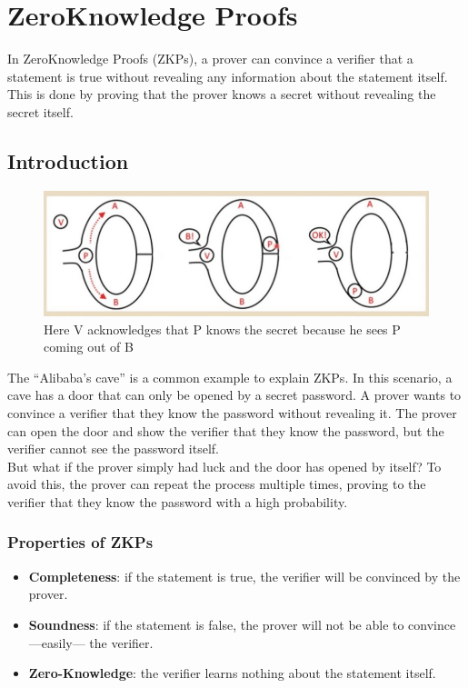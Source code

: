 \chapter{ZeroKnowledge Proofs}

In ZeroKnowledge Proofs (ZKPs), a prover can convince a verifier that a statement is true without revealing any information about the statement itself. This is done by proving that the prover knows a secret without revealing the secret itself.

\section{Introduction}

\begin{figure}[htbp]
   \centering
   \includegraphics{images/alibaba.png}
   \caption{Here V acknowledges that P knows the secret because he sees P coming out of B}
   \label{fig:alibaba}
\end{figure}

The ``Alibaba's cave'' is a common example to explain ZKPs. In this scenario, a cave has a door that can only be opened by a secret password. A prover wants to convince a verifier that they know the password without revealing it. The prover can open the door and show the verifier that they know the password, but the verifier cannot see the password itself.\\
But what if the prover simply had luck and the door has opened by itself? To avoid this, the prover can repeat the process multiple times, proving to the verifier that they know the password with a high probability.

\subsection{Properties of ZKPs}
\begin{itemize}
   \item \textbf{Completeness}: if the statement is true, the verifier will be convinced by the prover.
   \item \textbf{Soundness}: if the statement is false, the prover will not be able to convince ---easily--- the verifier. 
   \item \textbf{Zero-Knowledge}: the verifier learns nothing about the statement itself.
\end{itemize}

